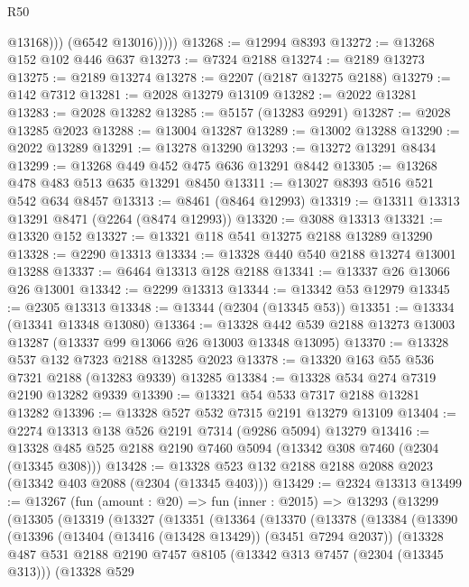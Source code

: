 \begin{lexlean}{R50}
\begin{coremodule}
                  @13168)))
            (@6542 @13016)))))
@13268 := @12994 @8393
@13272 := @13268 @152 @102 @446 @637
@13273 := @7324 @2188
@13274 := @2189 @13273
@13275 := @2189 @13274
@13278 := @2207 (@2187 @13275 @2188)
@13279 := @142 @7312
@13281 := @2028 @13279 @13109
@13282 := @2022 @13281
@13283 := @2028 @13282
@13285 := @5157 (@13283 @9291)
@13287 := @2028 @13285 @2023
@13288 := @13004 @13287
@13289 := @13002 @13288
@13290 := @2022 @13289
@13291 := @13278 @13290
@13293 := @13272 @13291 @8434
@13299 := @13268 @449 @452 @475 @636 @13291 @8442
@13305 := @13268 @478 @483 @513 @635 @13291 @8450
@13311 := @13027 @8393 @516 @521 @542 @634 @8457
@13313 := @8461 (@8464 @12993)
@13319 := @13311 @13313 @13291 @8471 (@2264 (@8474 @12993))
@13320 := @3088 @13313
@13321 := @13320 @152
@13327 := @13321 @118 @541 @13275 @2188 @13289 @13290
@13328 := @2290 @13313
@13334 := @13328 @440 @540 @2188 @13274 @13001 @13288
@13337 := @6464 @13313 @128 @2188
@13341 := @13337 @26 @13066 @26 @13001
@13342 := @2299 @13313
@13344 := @13342 @53 @12979
@13345 := @2305 @13313
@13348 := @13344 (@2304 (@13345 @53))
@13351 := @13334 (@13341 @13348 @13080)
@13364 := @13328 @442 @539 @2188 @13273 @13003 @13287 (@13337 @99 @13066 @26 @13003 @13348 @13095)
@13370 := @13328 @537 @132 @7323 @2188 @13285 @2023
@13378 := @13320 @163 @55 @536 @7321 @2188 (@13283 @9339) @13285
@13384 := @13328 @534 @274 @7319 @2190 @13282 @9339
@13390 := @13321 @54 @533 @7317 @2188 @13281 @13282
@13396 := @13328 @527 @532 @7315 @2191 @13279 @13109
@13404 := @2274 @13313 @138 @526 @2191 @7314 (@9286 @5094) @13279
@13416 := @13328 @485 @525 @2188 @2190 @7460 @5094 (@13342 @308 @7460 (@2304 (@13345 @308)))
@13428 := @13328 @523 @132 @2188 @2188 @2088 @2023 (@13342 @403 @2088 (@2304 (@13345 @403)))
@13429 := @2324 @13313
@13499 := @13267
    (fun (amount : @20) =>
    fun (inner : @2015) =>
    @13293
      (@13299
        (@13305
          (@13319
            (@13327
              (@13351
                (@13364
                  (@13370
                    (@13378
                      (@13384
                        (@13390
                          (@13396
                            (@13404 (@13416 (@13428 @13429)) (@3451 @7294 @2037))
                            (@13328
                              @487
                              @531
                              @2188
                              @2190
                              @7457
                              @8105
                              (@13342 @313 @7457 (@2304 (@13345 @313)))
                              (@13328
                                @529

\end{coremodule}
\end{lexlean}
